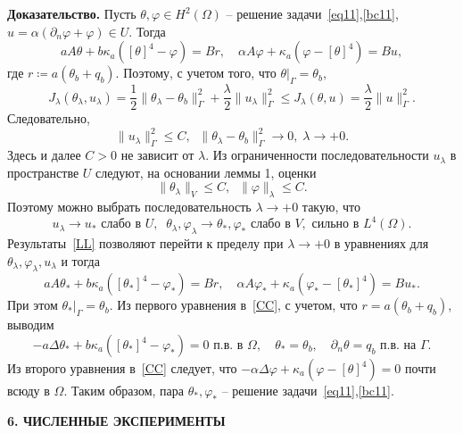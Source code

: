 \documentclass[12pt]{article}
\begin{document}
    \textbf{Доказательство.}
    Пусть $\theta,\varphi\in H^2(\Omega)$ -- решение задачи~\eqref{eq11},\eqref{bc11},
    $u=\alpha(\partial_n\varphi+\varphi)\in U.$ Тогда
    \[
        a A \theta + b \kappa_a ([\theta]^4 - \varphi ) = Br,\quad
        \alpha A \varphi + \kappa_a (\varphi - [\theta]^4)  = Bu,
    \]
    где $r \coloneqq a(\theta_b+q_b).$ Поэтому, с учетом того, что $\theta|_\Gamma=\theta_b$,
    \[
        J_\lambda(\theta_\lambda, u_\lambda) = \frac{1}{2}\|\theta_\lambda -\theta_b\|^2_\Gamma
        + \frac{\lambda}{2}\|u_\lambda\|^2_\Gamma\leq J_\lambda(\theta, u)=\frac{\lambda}{2}\|u\|^2_\Gamma.
    \]
    Следовательно,
    \[
        \|u_\lambda\|^2_\Gamma\leq C,\;\; \|\theta_\lambda -\theta_b\|^2_\Gamma\to 0,\; \lambda\to +0.
    \]
    Здесь и далее $C>0$ не зависит от $\lambda.$
    Из ограниченности последовательности $u_\lambda$ в пространстве $U$ следуют, на основании
    леммы 1, оценки
    \[
        \|\theta_\lambda\|_V \leq C,\;\;
        \|\varphi\|_\lambda \leq C.
    \]
    Поэтому можно выбрать последовательность $\lambda\to+0$ такую, что
    \begin{equation}
        \label{LL}
        u_\lambda \rightarrow u_* \text{  слабо в } U, \;\;
        \theta_\lambda, \varphi_\lambda \rightarrow \theta_*,\varphi_*
        \text{ слабо в } V, \text{ сильно в } L^4(\Omega).
    \end{equation}
    Результаты~\eqref{LL} позволяют перейти к пределу при $\lambda\to+0$
    в уравнениях для $\theta_\lambda,\varphi_\lambda,u_\lambda$ и тогда
    \begin{equation}
        \label{CC}
        a A \theta_* + b \kappa_a ([\theta_*]^4 - \varphi_* ) = Br,\quad
        \alpha A \varphi_* + \kappa_a (\varphi_* - [\theta_*]^4)  = Bu_*.
    \end{equation}
    При этом $\theta_*|_\Gamma=\theta_b.$
    Из первого уравнения в~\eqref{CC}, с учетом, что $r=a(\theta_b+q_b)$,
    выводим
    \[
        - a\Delta\theta_* + b\kappa_a([\theta_*]^4- \varphi_*)=0 \text{ п.в. в }\Omega,\quad
        \theta_*=\theta_b,\quad \partial_n\theta = q_b \text{ п.в. на  }\Gamma.
    \]
    Из второго уравнения в~\eqref{CC} следует, что $-\alpha \Delta \varphi +
    \kappa_a(\varphi-[\theta]^4)=0$ почти всюду в $\Omega$.
    Таким образом, пара $\theta_*,\varphi_*$ -- решение задачи~\eqref{eq11},\eqref{bc11}.

    \begin{center}
        \textbf{6. ЧИСЛЕННЫЕ ЭКСПЕРИМЕНТЫ}
    \end{center}
\end{document}
